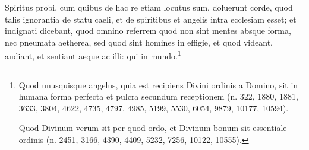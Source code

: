 \begin{topic}{77}
    Spiritus probi, cum quibus de hac re etiam locutus sum, doluerunt corde, quod talis ignorantia de statu caeli, et de
    spiritibus et angelis intra ecclesiam esset; et indignati dicebant, quod omnino referrem quod non sint mentes absque
    forma, nec pneumata aetherea, sed quod sint homines in effigie, et quod videant, audiant, et sentiant aeque ac illi:
    qui in mundo.\footnote{Quod unusquisque angelus, quia est recipiens Divini ordinis a Domino, sit in humana forma
    perfecta et pulcra secundum receptionem (n. 322, 1880, 1881, 3633, 3804, 4622, 4735, 4797, 4985, 5199, 5530, 6054,
    9879, 10177, 10594).

    Quod Divinum verum sit per quod ordo, et Divinum bonum sit essentiale ordinis (n. 2451, 3166, 4390, 4409, 5232,
    7256, 10122, 10555).}
\end{topic}
